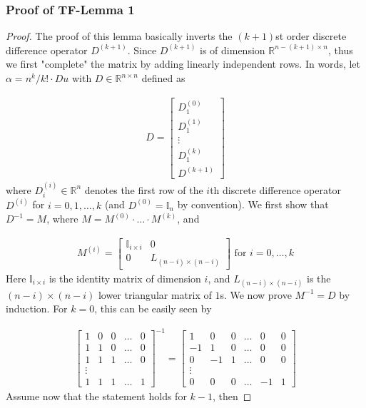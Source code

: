 \documentclass[a4paper]{article}
\newcommand{\RR}{\mathbb{R}}
\begin{document}
\subsubsection{Proof of TF-Lemma 1}
\begin{proof}
The proof of this lemma basically inverts the $(k+1)$st order discrete difference operator $D^{(k+1)}$. Since $D^{(k+1)}$ is of dimension $\RR^{n-(k+1)\times n}$, thus we first "complete" the matrix by adding linearly independent rows. In words, let $\alpha = n^k/k!\cdot Du$ with $D\in\RR^{n\times n}$ defined as

\begin{align*}
D = 
\begin{bmatrix}
D^{(0)}_1\\
D^{(1)}_1\\
\vdots\\
D^{(k)}_1\\
D^{(k+1)}
\end{bmatrix}
\end{align*}
where $D^{(i)}_i\in\RR^n$ denotes the first row of the $i$th discrete difference operator $D^{(i)}$ for $i = 0,1,\ldots, k$ (and $D^{(0)} = \mathbb{I}_n$ by convention). We first show that $D^{-1} = M$, where $M = M^{(0)}\cdot\ldots\cdot M^{(k)}$, and 

\begin{align*}
M^{(i)} = 
\begin{bmatrix}
\mathbb{I}_{i\times i} & 0\\
0 & L_{(n-i)\times(n-i)}
\end{bmatrix}
\text{ for } i = 0, \ldots, k
\end{align*}
Here $\mathbb{I}_{i\times i}$ is the identity matrix of dimension $i$, and $L_{(n-i)\times(n-i)}$ is the $(n-i)\times(n-i)$ lower triangular matrix of $1$s. We now prove $M^{-1} = D$ by induction. For $k = 0$, this can be easily seen by

\begin{align*}
\begin{bmatrix}
1 & 0 & 0 & \ldots & 0\\
1 & 1 & 0 & \ldots & 0\\
1 & 1 & 1 & \ldots & 0\\
\vdots\\
1 & 1 & 1 & \ldots & 1
\end{bmatrix}^{-1}
=
\begin{bmatrix}
1 & 0 & 0 & \ldots & 0 & 0\\
-1 & 1 & 0 & \ldots & 0 & 0\\
0 & -1 & 1 & \ldots & 0 & 0\\
\vdots\\
0 & 0 & 0 & \ldots & -1 & 1
\end{bmatrix}
\end{align*}
Assume now that the statement holds for $k -1$, then


\end{proof}
\end{document}
